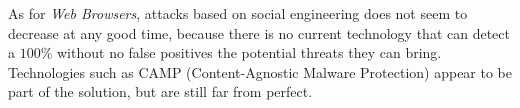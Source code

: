 \documentclass{sig-alternate-05-2015}
\begin{document}
As for \textit{Web Browsers}, attacks based on social engineering does not seem to decrease at any good time, because there is no current technology that can detect a \(100 \% \) without no false positives the potential threats they can bring. Technologies such as CAMP (Content-Agnostic Malware Protection) appear to be part of the solution, but are still far from perfect.



  
\end{document}
